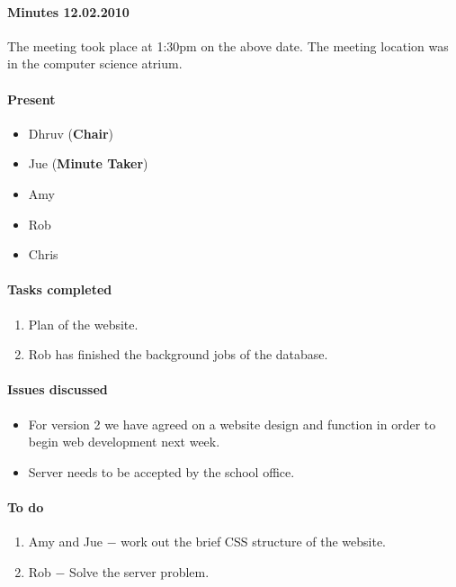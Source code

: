 \paragraph{Minutes 12.02.2010}  
The meeting took place at 1:30pm on the above date. The meeting location was in the computer science atrium. 

\paragraph{Present}

\begin{itemize}
	\item Dhruv (\textbf{Chair})
	\item Jue (\textbf{Minute Taker})
	\item Amy
	\item Rob
	\item Chris
	
\end{itemize}

\paragraph{Tasks completed}

\begin{enumerate}
	\item Plan of the website.
	\item Rob has finished the background jobs of the database.
\end{enumerate}

\paragraph{Issues discussed}

\begin{itemize}
	\item For version 2 we have agreed on a website design and function in order to begin web development next week.
	\item Server needs to be accepted by the school office.
	
\end{itemize}

\paragraph{To do}

\begin{enumerate}
	\item Amy and Jue $-$ work out the brief CSS structure of the website.
	\item Rob $-$ Solve the server problem.
\end{enumerate}
